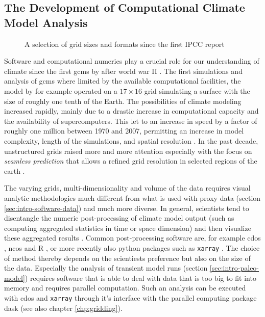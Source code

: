 \begin{refsection}
\subsection{The Development of Computational Climate Model Analysis} \label{sec:intro-software-model}

\begin{figure}
	\caption{A selection of grid sizes and formats since the first IPCC report}
	\label{fig: grid-sizes}
\end{figure}

Software and computational numerics play a crucial role for our understanding of climate since the first \glspl{gcm} by \cite{Phillips1956} after world war II \citep{Edwards2010, Lewis1998}. The first simulations and analysis of \glspl{gcm} where limited by the available computational facilities, the model by \cite{Phillips1956} for example operated on a $17 \times 16$ grid simulating a surface with the size of roughly one tenth of the Earth. The possibilities of climate modeling increased rapidly, mainly due to a drastic increase in computational capacity and the availability of supercomputers. This let to an increase in speed by a factor of roughly one million between 1970 and 2007, permitting an increase in model complexity, length of the simulations, and spatial resolution \citep{TreutSomervilleCubaschEtAl2007}. In the past decade, unstructured grids raised more and more attention \citep{ZaenglReinertRipodasEtAl2014, SkamarockKlempDudaEtAl2012} especially with the focus on \textit{seamless prediction} \citep{Hoskins2012, BauerThorpeBrunet2015} that allows a refined grid resolution in selected regions of the earth \citep{RautenhausBoettingerSiemenEtAl2018}.

The varying grids, multi-dimensionality and volume of the data requires visual analytic methodologies much different from what is used with proxy data (section \ref{sec:intro-software-data}) and much more diverse. In general, scientists tend to disentangle the numeric post-processing of climate model output (such as computing aggregated statistics in time or space dimension) and then visualize these aggregated results \citep{BoettingerRoeber2019, SchulzNockeHeitzlerEtAl2013}. Common post-processing software are, for example \glspl{cdo} \citep{Schulzweida2019}, \glspl{nco} \citep{Zender2008, ZenderMangalam2007, Zender2016} and R \citep{RCT2019}, or more recently also python packages such as \texttt{xarray} \citep{HoyerHamman2017}. The choice of method thereby depends on the scientiests preference but also on the size of the data. Especially the analysis of transient model runs (section \ref{sec:intro-paleo-model}) requires software that is able to deal with data that is too big to fit into memory and requires parallel computation. Such an analysis can be executed with \glspl{cdo} and \texttt{xarray} through it's interface with the parallel computing package dask \citep{DDT2016, Rocklin2015} (see also chapter \ref{chp:gridding}).


\end{refsection}
